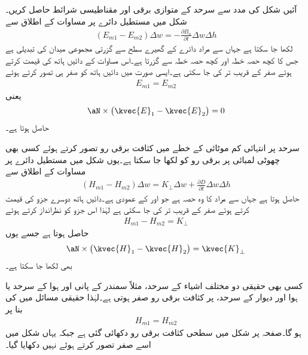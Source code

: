 آئیں شکل   کی مدد سے  سرحد کے متوازی برقی اور مقناطیسی شرائط حاصل کریں۔ شکل میں مستطیل دائرے پر مساوات  کے اطلاق سے
\begin{align*}
\left(E_{m1}-E_{m2}\right) \Delta w=-\frac{\partial B_{n}}{\partial t}  \Delta w \Delta h
\end{align*}  
لکھا جا سکتا ہے جہاں  سے مراد دائرے کے گھیرے سطح سے گزرتی مجموعی میدان کی تبدیلی ہے جس کا کچھ حصہ خطہ  اور کچھ حصہ خطہ  سے گزرتا ہے۔اس مساوات کے دائیں ہاتھ کی قیمت  کرتے ہوئے صفر کے قریب تر کی جا سکتی ہے۔ایسی صورت میں دائیں ہاتھ کو صفر ہی تصور کرتے ہوئے
\begin{align}\label{مساوات_میکس_ویل_سرحدی_شرائط_بدلتے_میدان_الف}
E_{m1}=E_{m2}
\end{align}
یعنی
\begin{align}
\aN \times \left(\kvec{E}_1-\kvec{E}_2 \right)=0
\end{align}
حاصل ہوتا ہے۔

سرحد پر انتہائی کم موٹائی کے خطے میں کثافت برقی رو  تصور کرتے ہوئے کسی بھی چھوٹی لمبائی  پر برقی رو کو  لکھا جا سکتا ہے۔یوں شکل  میں مستطیل دائرے پر مساوات  کے اطلاق سے
\begin{align*}
\left(H_{m1}-H_{m2} \right) \Delta w=K_\perp \Delta w +\frac{\partial D}{\partial t} \Delta w \Delta h
\end{align*}
حاصل ہوتا ہے جہاں  سے مراد  کا وہ حصہ ہے جو  اور  کے عمودی ہے۔دائیں ہاتھ دوسرے جزو کی قیمت  کرتے ہوئے صفر کے قریب تر کی جا سکتی ہے لہٰذا اس جزو کو نظرانداز کرتے ہوئے
\begin{align}\label{مساوات_میکس_ویل_متوازی_مقناطیسی_موج_سرحدی_شرط}
H_{m1}-H_{m2}=K_\perp
\end{align}
حاصل ہوتا ہے جسے یوں
\begin{align}
\aN \times \left(\kvec{H}_1-\kvec{H}_2 \right)=\kvec{K}_\perp
\end{align}
بھی لکھا جا سکتا ہے۔

کسی بھی حقیقی دو مختلف اشیاء کے سرحد، مثلاً سمندر کے پانی اور ہوا کے سرحد یا ہوا اور دیوار کے سرحد، پر کثافت برقی رو  صفر ہوتی ہے۔لہٰذا حقیقی مسائل میں  کی بنا پر
\begin{align}\label{مساوات_میکس_ویل_سرحدی_شرائط_بدلتے_میدان_ب}
H_{m1}=H_{m2}
\end{align}
ہو گا۔صفحہ  پر شکل  میں سطحی کثافت برقی رو  دکھائی گئی ہے جبکہ یہاں شکل  میں اسے صفر تصور کرتے ہوئے نہیں دکھایا گیا۔

